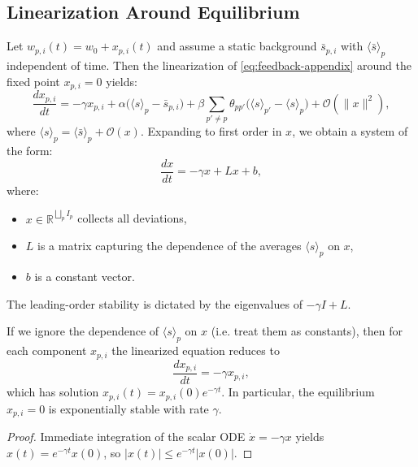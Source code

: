 \documentclass[11pt]{article}
\begin{document}
\subsection{Linearization Around Equilibrium}

Let \(w_{p,i}(t) = w_0 + x_{p,i}(t)\) and assume a static background
\(\bar{s}_{p,i}\) with \(\langle \bar{s} \rangle_p\) independent of time.
Then the linearization of \eqref{eq:feedback-appendix} around the fixed
point \(x_{p,i}=0\) yields:
\begin{equation}
  \frac{dx_{p,i}}{dt}
    = -\gamma x_{p,i}
      + \alpha\bigl(\langle s \rangle_p - \bar{s}_{p,i} \bigr)
      + \beta \sum_{p' \neq p} \theta_{pp'}
          \bigl(\langle s \rangle_{p'} - \langle s \rangle_p \bigr)
      + \mathcal{O}(\|x\|^2),
\end{equation}
where \(\langle s \rangle_p = \langle \bar{s} \rangle_p + \mathcal{O}(x)\).
Expanding to first order in \(x\), we obtain a system of the form:
\begin{equation}
  \frac{dx}{dt}
    = -\gamma x + L x + b,
\end{equation}
where:
\begin{itemize}
  \item \(x \in \mathbb{R}^{\bigsqcup_p I_p}\) collects all deviations,
  \item \(L\) is a matrix capturing the dependence of the averages
        \(\langle s \rangle_p\) on \(x\),
  \item \(b\) is a constant vector.
\end{itemize}
The leading-order stability is dictated by the eigenvalues of
\(-\gamma I + L\).

\begin{lemma}
If we ignore the dependence of \(\langle s \rangle_p\) on \(x\) (i.e. treat
them as constants), then for each component \(x_{p,i}\) the linearized
equation reduces to
\begin{equation}
  \frac{dx_{p,i}}{dt} = -\gamma x_{p,i},
\end{equation}
which has solution \(x_{p,i}(t) = x_{p,i}(0)e^{-\gamma t}\). In
particular, the equilibrium \(x_{p,i}=0\) is exponentially stable with rate
\(\gamma\).
\end{lemma}

\begin{proof}
Immediate integration of the scalar ODE
\(
  \dot{x} = -\gamma x
\)
yields
\(
  x(t) = e^{-\gamma t} x(0)
\),
so \(|x(t)| \le e^{-\gamma t} |x(0)|\).
\end{proof}
\end{document}
